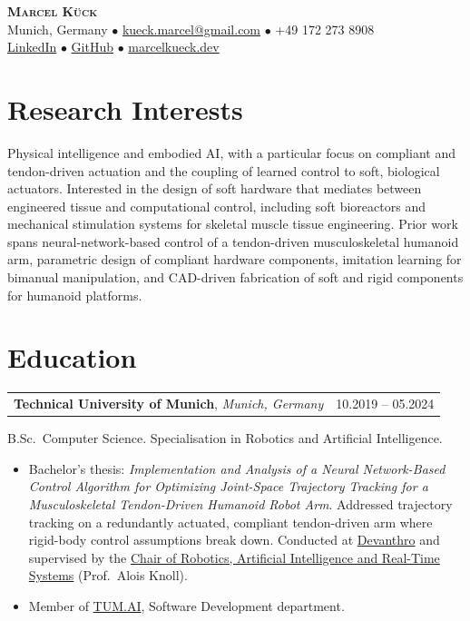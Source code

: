 \documentclass[11pt,a4paper]{article}
\makeatletter
\newcommand{\cventry}[3]{%
    \begin{tabularx}{\textwidth}{@{}Xr@{}}
        \textbf{#1}, \textit{#2} & #3 \\
    \end{tabularx}%
    \vspace{-0.35em}\par%
}
\makeatother
\begin{document}
\begin{center}
    {\Huge\scshape\bfseries Marcel Kück}\\[0.5em]
    {\small
        Munich, Germany \enspace$\bullet$\enspace
        \href{mailto:kueck.marcel@gmail.com}{kueck.marcel@gmail.com} \enspace$\bullet$\enspace
        +49 172 273 8908\\[0.15em]
        \href{https://www.linkedin.com/in/marcel-kueck}{LinkedIn} \enspace$\bullet$\enspace
        \href{https://github.com/MarcelKueck}{GitHub} \enspace$\bullet$\enspace
        \href{https://www.marcelkueck.dev/}{marcelkueck.dev}
    }
\end{center}

\section*{Research Interests}

Physical intelligence and embodied AI, with a particular focus on compliant and tendon-driven actuation and the coupling of learned control to soft, biological actuators. Interested in the design of soft hardware that mediates between engineered tissue and computational control, including soft bioreactors and mechanical stimulation systems for skeletal muscle tissue engineering. Prior work spans neural-network-based control of a tendon-driven musculoskeletal humanoid arm, parametric design of compliant hardware components, imitation learning for bimanual manipulation, and CAD-driven fabrication of soft and rigid components for humanoid platforms.

\section*{Education}

\cventry{Technical University of Munich}{Munich, Germany}{10.2019 -- 05.2024}
B.Sc.\ Computer Science. Specialisation in Robotics and Artificial Intelligence.
\begin{itemize}
    \item Bachelor's thesis: \textit{Implementation and Analysis of a Neural Network-Based Control Algorithm for Optimizing Joint-Space Trajectory Tracking for a Musculoskeletal Tendon-Driven Humanoid Robot Arm}. Addressed trajectory tracking on a redundantly actuated, compliant tendon-driven arm where rigid-body control assumptions break down. Conducted at \href{https://www.devanthro.com/}{Devanthro} and supervised by the \href{https://www.ce.cit.tum.de/en/air/home/}{Chair of Robotics, Artificial Intelligence and Real-Time Systems} (Prof.\ Alois Knoll).
    \item Member of \href{https://www.tum-ai.com/}{TUM.AI}, Software Development department.
\end{itemize}
\end{document}
